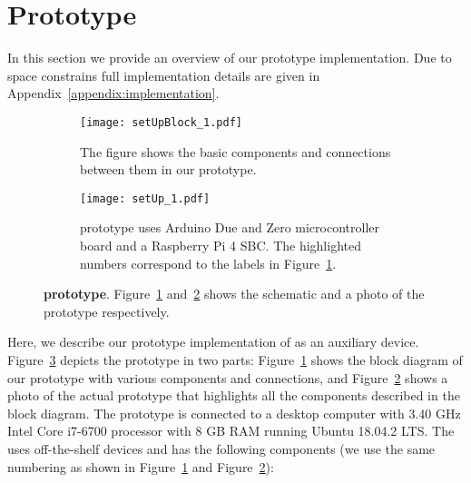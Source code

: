 \section{\name Prototype}
\label{sec:prototype}

In this section we provide an overview of our \name prototype implementation. Due to space constrains full implementation details are given in Appendix~\ref{appendix:implementation}.

\begin{figure}[t]
    \begin{center}
        \begin{subfigure}{0.4\textwidth}
        \centering
            \texttt{[image: setUpBlock\_1.pdf]}
            \caption{The figure shows the basic components and connections between them in our \name prototype.}
            \label{fig:prototypeArch}    
        \end{subfigure}
    \end{center}
    
    
    \begin{center}
        \begin{subfigure}{0.4\textwidth}
        \centering
        \texttt{[image: setUp\_1.pdf]}
        \caption{\name prototype uses Arduino Due and Zero microcontroller board and a Raspberry Pi 4 SBC. The highlighted numbers correspond to the labels in Figure~\ref{fig:prototypeArch}.}
        \label{fig:prototype}
    \end{subfigure}
    \end{center}
    \vspace{-1em}
    
    \caption{\textbf{\name prototype}. Figure~\ref{fig:prototypeArch} and~\ref{fig:prototype} shows the schematic and a photo of the  \name prototype respectively.} 
    \label{fig:prototypeAll}
    \spacesave
\end{figure}

 Here, we describe our prototype implementation of \name as an auxiliary device. Figure~\ref{fig:prototypeAll} depicts the \name prototype in two parts: Figure~\ref{fig:prototypeArch} shows the block diagram of our prototype with various components and connections, and Figure~\ref{fig:prototype} shows a photo of the actual prototype that highlights all the components described in the block diagram. The prototype \device is connected to a desktop computer with 3.40 GHz Intel Core i7-6700 processor with 8 GB RAM running Ubuntu 18.04.2 LTS. The \device uses off-the-shelf devices and has the following components (we use the same numbering as shown in Figure~\ref{fig:prototypeArch} and  Figure~\ref{fig:prototype}):

